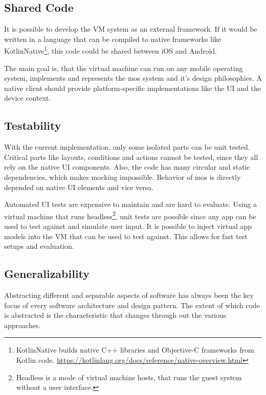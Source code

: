 \subsection{Shared Code}

It is possible to develop the \ac{VM} system as an external framework.
If it would be written in a language that can be compiled to native frameworks like KotlinNative\footnote{KotlinNative builds native C++ libraries and Objective-C frameworks from Kotlin code. \url{https://kotlinlang.org/docs/reference/native-overview.html}}, this code could be shared between iOS and Android.

The main goal is, that the virtual machine can run on any mobile operating system, implements and represents the \ac{mos} system and it's design philosophies.
A native client should provide platform-specific implementations like the \ac{UI} and the device context.

\subsection{Testability}

With the current implementation, only some isolated parts can be unit tested.
Critical parts like layouts, conditions and actions cannot be tested, since they all rely on the native \ac{UI} components.
Also, the code has many circular and static dependencies, which makes mocking impossible.
Behavior of \ac{mos} is directly depended on native \ac{UI} elements and vice versa.

Automated \ac{UI} tests are expensive to maintain and are hard to evaluate.
Using a virtual machine that runs headless\footnote{Headless is a mode of virtual machine hosts, that runs the guest system without a user interface.}, unit tests are possible since any app can be used to test against and simulate user input.
It is possible to inject virtual app models into the \ac{VM} that can be used to test against.
This allows for fast test setups and evaluation.

\subsection{Generalizability}

Abstracting different and separable aspects of software has always been the key focus of every software architecture and design pattern.
The extent of which code is abstracted is the characteristic that changes through out the various approaches.

